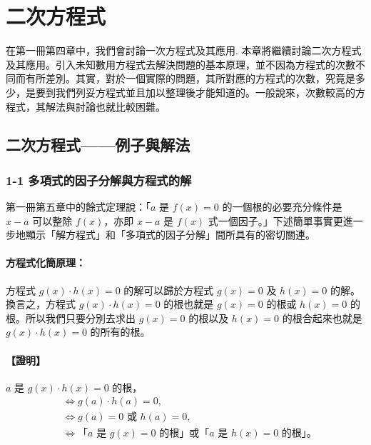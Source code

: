 
\section{二次方程式}\label{sec:b2_ch1}

在第一冊第四章中，我們會討論一次方程式及其應用\label{note:b2-ch1-intro-ceng}. 本章將繼續討論二次方程式及其應用。引入未知數用方程式去解決問題的基本原理，並不因為方程式的次數不同而有所差別。其實，對於一個實際的問題，其所對應的方程式的次數，究竟是多少，是要到我們列妥方程式並且加以整理後才能知道的。一般說來，次數較高的方程式，其解法與討論也就比較困難。

\subsection{二次方程式——例子與解法}\label{sec:b2_1-1}

\subsubsection*{1-1 多項式的因子分解與方程式的解}

第一冊第五章中的餘式定理說：「$a$ 是 $f(x)=0$ 的一個根的必要充分條件是 $x-a$ 可以整除 $f(x)$，亦即 $x-a$ 是 $f(x)$ 式一個因子。」下述簡單事實更進一步地顯示「解方程式」和「多項式的因子分解」間所具有的密切關連。

\paragraph{方程式化簡原理：} 方程式 $g(x) \cdot h(x)=0$ 的解可以歸於方程式 $g(x)=0$ 及 $h(x)=0$ 的解。換言之，方程式 $g(x)\cdot h(x)=0$ 的根也就是 $g(x)=0$ 的根或 $h(x)=0$ 的根。所以我們只要分別去求出 $g(x)=0$ 的根以及 $h(x)=0$ 的根合起來也就是 $g(x)\cdot h(x)=0$ 的所有的根。
\paragraph{【證明】}
$a$ 是 $g(x)\cdot h(x)=0$ 的根，
\begin{align*}
&\iff g(a)\cdot h(a)=0, \\
&\iff g(a)=0 \text{ 或 } h(a)=0, \\
&\iff \text{「$a$ 是 $g(x)=0$ 的根」或「$a$ 是 $h(x)=0$ 的根」。}
\end{align*}


